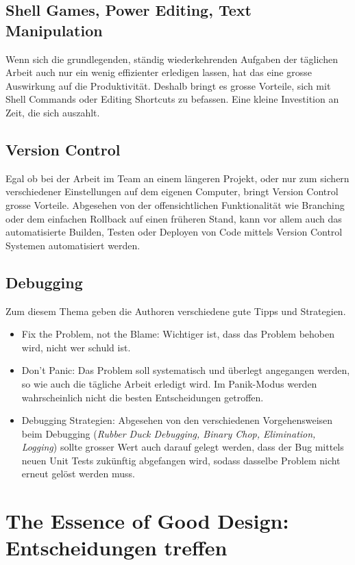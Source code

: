 \documentclass[10pt, oneside]{article}
\begin{document}
\subsection{Shell Games, Power Editing, Text Manipulation}
Wenn sich die grundlegenden, ständig wiederkehrenden Aufgaben der täglichen Arbeit auch nur ein wenig effizienter erledigen lassen, hat das eine grosse Auswirkung auf die Produktivität.
Deshalb bringt es grosse Vorteile, sich mit Shell Commands oder Editing Shortcuts zu befassen. Eine kleine Investition an Zeit, die sich auszahlt.\\

\subsection{Version Control}
Egal ob bei der Arbeit im Team an einem längeren Projekt, oder nur zum sichern verschiedener Einstellungen auf dem eigenen Computer, bringt Version Control grosse Vorteile.
Abgesehen von der offensichtlichen Funktionalität wie Branching oder dem einfachen Rollback auf einen früheren Stand, kann vor allem auch das automatisierte Builden, Testen oder Deployen von Code mittels 
Version Control Systemen automatisiert werden.

\subsection{Debugging}
Zum diesem Thema geben die Authoren verschiedene gute Tipps und Strategien.
\begin{itemize}[itemsep=4pt]
    \item Fix the Problem, not the Blame: 
    Wichtiger ist, dass das Problem behoben wird, nicht wer schuld ist.
    \item Don't Panic:
    Das Problem soll systematisch und überlegt angegangen werden, so wie auch die tägliche Arbeit erledigt wird. Im Panik-Modus werden wahrscheinlich nicht 
    die besten Entscheidungen getroffen. 
    \item Debugging Strategien:
    Abgesehen von den verschiedenen Vorgehensweisen beim Debugging (\emph{Rubber Duck Debugging, Binary Chop, Elimination, Logging}) 
    sollte grosser Wert auch darauf gelegt werden, 
    dass der Bug mittels neuen Unit Tests zukünftig abgefangen wird, sodass dasselbe Problem nicht erneut gelöst werden muss.
\end{itemize}

\section{The Essence of Good Design: Entscheidungen treffen}
\end{document}
